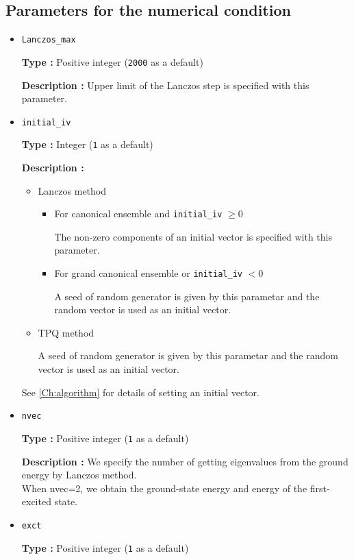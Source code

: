 \subsection{Parameters for the numerical condition}
\begin{itemize}
\item \verb|Lanczos_max|

{\bf Type :} Positive integer (\verb|2000| as a default)

{\bf Description :} Upper limit of the Lanczos step is specified with this parameter.

\item \verb|initial_iv|

{\bf Type :} Integer (\verb|1| as a default)

{\bf Description :} 
\begin{itemize}
\item{Lanczos method}
\begin{itemize}
\item{For canonical ensemble and \verb|initial_iv| $\geq 0$}

The non-zero components of an initial vector is specified with this parameter. 

\item{For grand canonical ensemble or \verb|initial_iv| $< 0$}

A seed of random generator is given by this parametar and the random vector is used as an initial vector.
\end{itemize}

\item{TPQ method}

A seed of random generator is given by this parametar and the random vector is used as an initial vector.
\end{itemize}
See \ref{Ch:algorithm} for details of setting an initial vector.

\item \verb|nvec|

{\bf Type :} Positive integer (\verb|1| as a default)

{\bf Description :} We specify the number of getting 
eigenvalues from the ground energy by Lanczos method.\\
When nvec=2, we obtain the ground-state energy and energy of the first-excited state.

\item \verb|exct|

{\bf Type :} Positive integer (\verb|1| as a default)


\end{itemize}
